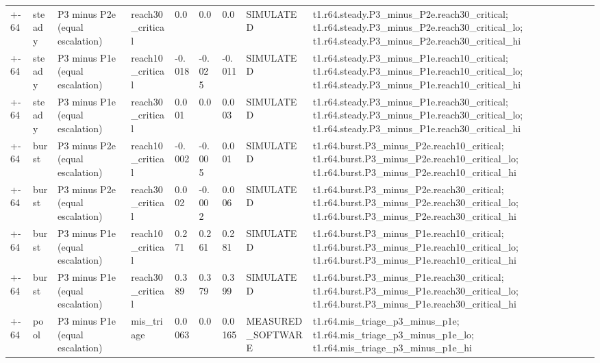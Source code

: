 \begin{table}[t]
\begin{tabular}{lllllllll}
+-64 & steady & P3 minus P2e (equal escalation) & reach30\_critical & 0.0 & 0.0 & 0.0 & SIMULATED & t1.r64.steady.P3\_minus\_P2e.reach30\_critical; t1.r64.steady.P3\_minus\_P2e.reach30\_critical\_lo; t1.r64.steady.P3\_minus\_P2e.reach30\_critical\_hi \\
+-64 & steady & P3 minus P1e (equal escalation) & reach10\_critical & -0.018 & -0.025 & -0.011 & SIMULATED & t1.r64.steady.P3\_minus\_P1e.reach10\_critical; t1.r64.steady.P3\_minus\_P1e.reach10\_critical\_lo; t1.r64.steady.P3\_minus\_P1e.reach10\_critical\_hi \\
+-64 & steady & P3 minus P1e (equal escalation) & reach30\_critical & 0.001 & 0.0 & 0.003 & SIMULATED & t1.r64.steady.P3\_minus\_P1e.reach30\_critical; t1.r64.steady.P3\_minus\_P1e.reach30\_critical\_lo; t1.r64.steady.P3\_minus\_P1e.reach30\_critical\_hi \\
+-64 & burst & P3 minus P2e (equal escalation) & reach10\_critical & -0.002 & -0.005 & 0.001 & SIMULATED & t1.r64.burst.P3\_minus\_P2e.reach10\_critical; t1.r64.burst.P3\_minus\_P2e.reach10\_critical\_lo; t1.r64.burst.P3\_minus\_P2e.reach10\_critical\_hi \\
+-64 & burst & P3 minus P2e (equal escalation) & reach30\_critical & 0.002 & -0.002 & 0.006 & SIMULATED & t1.r64.burst.P3\_minus\_P2e.reach30\_critical; t1.r64.burst.P3\_minus\_P2e.reach30\_critical\_lo; t1.r64.burst.P3\_minus\_P2e.reach30\_critical\_hi \\
+-64 & burst & P3 minus P1e (equal escalation) & reach10\_critical & 0.271 & 0.261 & 0.281 & SIMULATED & t1.r64.burst.P3\_minus\_P1e.reach10\_critical; t1.r64.burst.P3\_minus\_P1e.reach10\_critical\_lo; t1.r64.burst.P3\_minus\_P1e.reach10\_critical\_hi \\
+-64 & burst & P3 minus P1e (equal escalation) & reach30\_critical & 0.389 & 0.379 & 0.399 & SIMULATED & t1.r64.burst.P3\_minus\_P1e.reach30\_critical; t1.r64.burst.P3\_minus\_P1e.reach30\_critical\_lo; t1.r64.burst.P3\_minus\_P1e.reach30\_critical\_hi \\
+-64 & pool & P3 minus P1e (equal escalation) & mis\_triage & 0.0063 & 0.0 & 0.0165 & MEASURED\_SOFTWARE & t1.r64.mis\_triage\_p3\_minus\_p1e; t1.r64.mis\_triage\_p3\_minus\_p1e\_lo; t1.r64.mis\_triage\_p3\_minus\_p1e\_hi \\
\bottomrule
\end{tabular}
\end{table}
